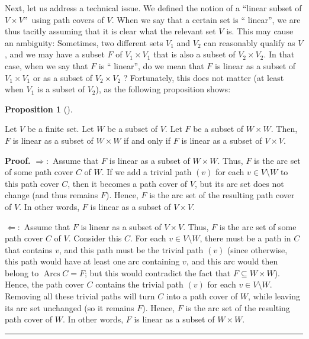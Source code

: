 \documentclass[numbers=enddot,12pt,final,onecolumn,notitlepage]{scrartcl}%
\numberwithin{exer}{section}
\theoremstyle{definition}
\newtheorem{prop}[theo]{Proposition}
\newenvironment{proposition}[1][]
{\begin{prop}[#1]\begin{leftbar}}
{\end{leftbar}\end{prop}}
\newenvironment{proof}[1][Proof]{\noindent\textbf{#1.} }{\ \rule{0.5em}{0.5em}}
\newenvironment{vershort}{}{}
\begin{document}
Next, let us address a technical issue. We defined the notion of a
\textquotedblleft linear subset of $V\times V$\textquotedblright\ using path
covers of $V$. When we say that a certain set is \textquotedblleft
linear\textquotedblright, we are thus tacitly assuming that it is clear what
the relevant set $V$ is. This may cause an ambiguity: Sometimes, two different
sets $V_{1}$ and $V_{2}$ can reasonably qualify as $V$, and we may have a
subset $F$ of $V_{1}\times V_{1}$ that is also a subset of $V_{2}\times V_{2}%
$. In that case, when we say that $F$ is \textquotedblleft
linear\textquotedblright, do we mean that $F$ is linear as a subset of
$V_{1}\times V_{1}$ or as a subset of $V_{2}\times V_{2}$ ? Fortunately, this
does not matter (at least when $V_{1}$ is a subset of $V_{2}$), as the
following proposition shows:

\begin{proposition}
\label{prop.linear.VW}Let $V$ be a finite set. Let $W$ be a subset of $V$. Let
$F$ be a subset of $W\times W$. Then, $F$ is linear as a subset of $W\times W$
if and only if $F$ is linear as a subset of $V\times V$.
\end{proposition}

\begin{vershort}


\begin{proof}
$\Longrightarrow:$ Assume that $F$ is linear as a subset of $W\times W$. Thus,
$F$ is the arc set of some path cover $C$ of $W$. If we add a trivial path
$\left(  v\right)  $ for each $v \in V \setminus W$ to this path cover $C$,
then it becomes a path cover of $V$, but its arc set does not change (and thus
remains $F$). Hence, $F$ is the arc set of the resulting path cover of $V$. In
other words, $F$ is linear as a subset of $V \times V$. \medskip

$\Longleftarrow:$ Assume that $F$ is linear as a subset of $V\times V$. Thus,
$F$ is the arc set of some path cover $C$ of $V$. Consider this $C$. For each
$v \in V \setminus W$, there must be a path in $C$ that contains $v$, and this
path must be the trivial path $\left(  v\right)  $ (since otherwise, this path
would have at least one arc containing $v$, and this arc would then belong to
$\operatorname{Arcs} C = F$; but this would contradict the fact that $F
\subseteq W \times W$). Hence, the path cover $C$ contains the trivial path
$\left(  v\right)  $ for each $v \in V \setminus W$. Removing all these
trivial paths will turn $C$ into a path cover of $W$, while leaving its arc
set unchanged (so it remains $F$). Hence, $F$ is the arc set of the resulting
path cover of $W$. In other words, $F$ is linear as a subset of $W \times W$.
\end{proof}
\end{vershort}
\end{document}
